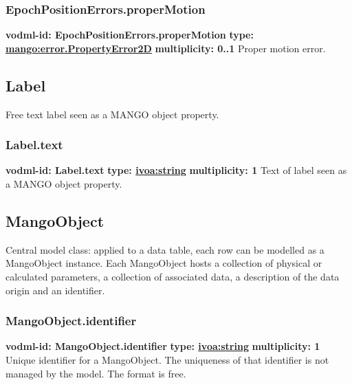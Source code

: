     \subsubsection{EpochPositionErrors.properMotion}
      \textbf{vodml-id: EpochPositionErrors.properMotion} \newline
      \textbf{type: \hyperref[sect:error.PropertyError2D]{mango:error.PropertyError2D}} \newline
      \textbf{multiplicity: 0..1} \newline 
      Proper motion error.

  \subsection{Label}
  \label{sect:Label}
    Free text label seen as a MANGO object property.

    \subsubsection{Label.text}
      \textbf{vodml-id: Label.text} \newline
      \textbf{type: \hyperref[sect:ivoa]{ivoa:string}} \newline
      \textbf{multiplicity: 1} \newline 
      Text of label seen as a MANGO object property.

  \subsection{MangoObject}
  \label{sect:MangoObject}
    Central model class: applied to a data table, each row can be modelled as a MangoObject instance. Each MangoObject hosts a collection of physical or calculated parameters, a collection of associated data, a description of the data origin and an identifier.

    \subsubsection{MangoObject.identifier}
      \textbf{vodml-id: MangoObject.identifier} \newline
      \textbf{type: \hyperref[sect:ivoa]{ivoa:string}} \newline
      \textbf{multiplicity: 1} \newline 
      Unique identifier for a MangoObject. The uniqueness of that identifier is not managed by the model. The format is free.

